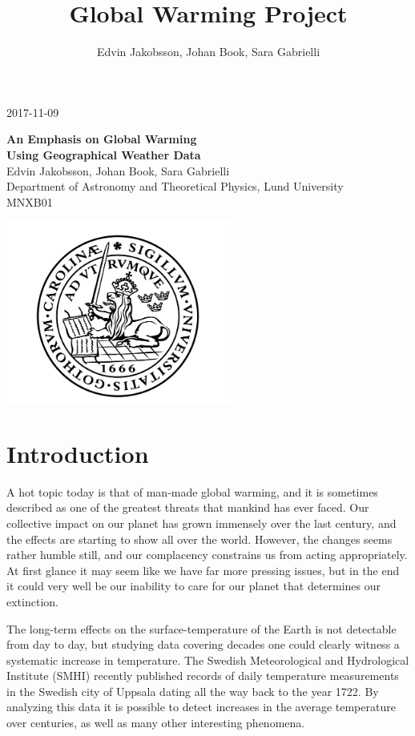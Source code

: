 \documentclass[a4paper]{article}
\title{Global Warming Project}
\author{Edvin Jakobsson, Johan Book, Sara Gabrielli}
\begin{document}
\begin{titlepage}
	\begin{flushright}
		2017-11-09\\
	\end{flushright}
	\vfill
	\begin{center}
		{\huge\bf An Emphasis on Global Warming 
		\\[3mm] 
		\large Using Geographical Weather Data
		}
		\\[3cm]
		{Edvin Jakobsson, Johan Book, Sara Gabrielli}
		\\[5mm]
		{Department of Astronomy and Theoretical Physics, Lund University}
		\\[2cm]
		{MNXB01}

		\vfill
		\includegraphics[height=6cm]{logo_no_text.png}
	\end{center}
\end{titlepage}

\tableofcontents

\newpage
\section{Introduction}

A hot topic today is that of man-made global warming, and it is sometimes described as one of the greatest threats that mankind has ever faced. Our collective impact on our planet has grown immensely over the last century, and the effects are starting to show all over the world. However, the changes seems rather humble still, and our complacency constrains us from acting appropriately. At first glance it may seem like we have far more pressing issues, but in the end it could very well be our inability to care for our planet that determines our extinction.

\medskip
\medskip
The long-term effects on the surface-temperature of the Earth is not detectable from day to day, but studying data covering decades one could clearly witness a systematic increase in temperature. The Swedish Meteorological and Hydrological Institute (SMHI) recently published records of daily temperature measurements in the Swedish city of Uppsala dating all the way back to the year 1722. By analyzing this data it is possible to detect increases in the average temperature over centuries, as well as many other interesting phenomena.
\end{document}
